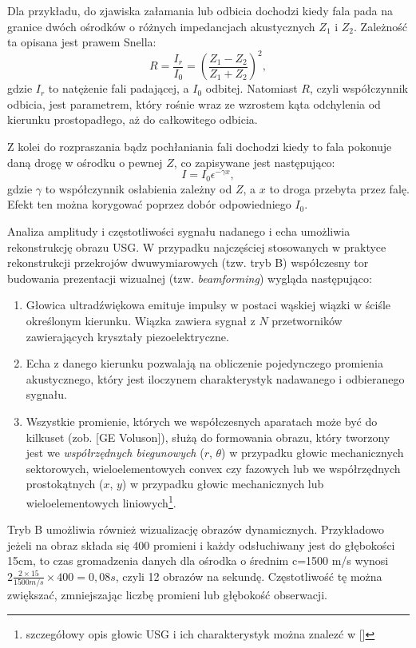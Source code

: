 Dla przykładu, do zjawiska załamania lub odbicia dochodzi kiedy fala pada na granice dwóch ośrodków o różnych impedancjach akustycznych $Z_1$ i $Z_2$. Zależność ta opisana jest prawem Snella:
\begin{equation}
R = \frac{I_r}{I_0} = \left(\frac{Z_1-Z_2}{Z_1+Z_2}\right)^2,
\end{equation}
gdzie $I_r$ to natężenie fali padającej, a $I_0$ odbitej. Natomiast $R$, czyli współczynnik odbicia, jest parametrem, który rośnie wraz ze wzrostem kąta odchylenia od kierunku prostopadłego, aż do całkowitego odbicia.

Z kolei do rozpraszania bądz pochłaniania fali dochodzi kiedy to fala pokonuje daną drogę w ośrodku o pewnej $Z$, co zapisywane jest następująco:
\begin{equation}
I=I_0 \epsilon^{-\gamma x},
\end{equation}
gdzie $\gamma$ to współczynnik osłabienia zależny od $Z$, a $x$ to droga przebyta przez falę. Efekt ten można korygować poprzez dobór odpowiedniego $I_0$.

Analiza amplitudy i częstotliwości sygnału nadanego i echa umożliwia rekonstrukcję obrazu USG. W przypadku najczęściej stosowanych w praktyce rekonstrukcji przekrojów dwuwymiarowych (tzw. tryb B) współczesny tor budowania prezentacji wizualnej (tzw. \textit{beamforming}) wygląda następująco: 
\begin{enumerate}
	\item Głowica ultradźwiękowa emituje impulsy w postaci wąskiej wiązki w ściśle określonym kierunku. Wiązka zawiera sygnał z $N$ przetworników zawierających kryształy piezoelektryczne.
	\item Echa z danego kierunku pozwalają na obliczenie pojedynczego promienia akustycznego, który jest iloczynem charakterystyk nadawanego i odbieranego sygnału.
	\item Wszystkie promienie, których we współczesnych aparatach może być do kilkuset (zob. [GE Voluson]), służą do formowania obrazu, który tworzony jest we \textit{współrzędnych biegunowych} ($r$, $\theta$) w przypadku głowic mechanicznych sektorowych, wieloelementowych convex czy fazowych lub we współrzędnych prostokątnych ($x$, $y$) w przypadku głowic mechanicznych lub wieloelementowych liniowych\footnote{szczegółowy opis głowic USG i ich charakterystyk można znalezć w []}. 
\end{enumerate}

Tryb B umożliwia również wizualizację obrazów dynamicznych. Przykładowo jeżeli na obraz składa się 400 promieni i każdy odsłuchiwany jest do głębokości 15cm, to czas gromadzenia danych dla ośrodka o średnim c=1500 m/s wynosi $2\frac{2\times15}{1500 m/s}\times400 = 0,08 s$, czyli 12 obrazów na sekundę. Częstotliwość tę można zwiększać, zmniejszając liczbę promieni lub głębokość obserwacji.

